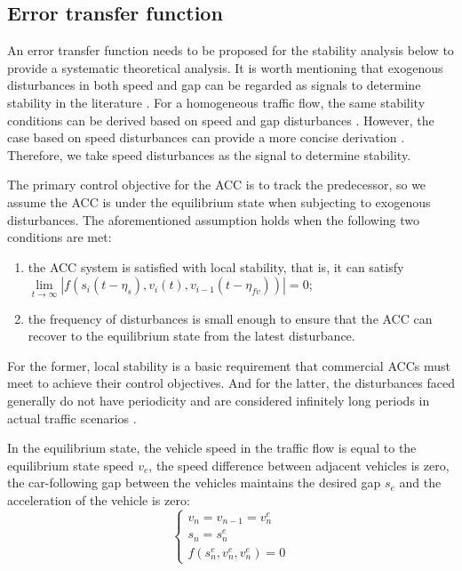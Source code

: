 \documentclass[journal]{IEEEtran}
\begin{document}
\subsection{Error transfer function}
\label{Section 4.2}

An error transfer function needs to be proposed for the stability analysis below to provide a systematic theoretical analysis. It is worth mentioning that exogenous disturbances in both speed and gap can be regarded as signals to determine stability in the literature \citep{Navas2019,Feng2019,Qin2018,Jin2014}. For a homogeneous traffic flow, the same stability conditions can be derived based on speed and gap disturbances \citep{Montanino2021,Montanino2021a,Zheng2015}. However, the case based on speed disturbances can provide a more concise derivation \citep{Wang2018a}. Therefore, we take speed disturbances as the signal to determine stability.

The primary control objective for the ACC is to track the predecessor, so we assume the ACC is under the equilibrium state when subjecting to exogenous disturbances. The aforementioned assumption holds when the following two conditions are met:
\begin{enumerate}
  \item the ACC system is satisfied with local stability, that is, it can satisfy $\mathop {\lim }\limits_{t \to \infty } \left| {f\left( {{s_i}\left( {t - {\eta _s}} \right),{v_i}(t),{v_{i - 1}}\left( {t - {\eta _{fv}}} \right)} \right)} \right| = 0$;
  \item the frequency of disturbances is small enough to ensure that the ACC can recover to the equilibrium state from the latest disturbance.
\end{enumerate}

For the former, local stability is a basic requirement that commercial ACCs must meet to achieve their control objectives. And for the latter, the disturbances faced generally do not have periodicity and are considered infinitely long periods in actual traffic scenarios \citep{Bian2019,Xiao2011}.

In the equilibrium state, the vehicle speed in the traffic flow is equal to the equilibrium state speed $v_e$, the speed difference between adjacent vehicles is zero, the car-following gap between the vehicles maintains the desired gap $s_e$ and the acceleration of the vehicle is zero:
\begin{equation}
  \left\{\begin{array}{l}
    v_{n}=v_{n-1}=v_{n}^{e} \\
    s_{n}=s_{n}^{e}         \\
    f\left(s_{n}^{e}, v_{n}^{e}, v_{n}^{e}\right)=0
  \end{array}\right.
  \label{Eq20}
\end{equation}
\end{document}
